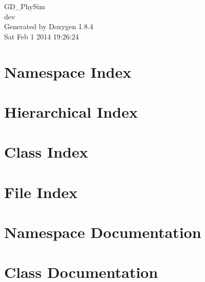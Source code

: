 \documentclass[twoside]{book}
\newcommand{\clearemptydoublepage}{%
  \newpage{\pagestyle{empty}\cleardoublepage}%
}
\begin{document}
\hypersetup{pageanchor=false}
\begin{titlepage}
\vspace*{7cm}
\begin{center}%
{\Large G\-D\-\_\-\-Phy\-Sim \\[1ex]\large dev }\\
\vspace*{1cm}
{\large Generated by Doxygen 1.8.4}\\
\vspace*{0.5cm}
{\small Sat Feb 1 2014 19:26:24}\\
\end{center}
\end{titlepage}
\clearemptydoublepage
\tableofcontents
\clearemptydoublepage
{}
\hypersetup{pageanchor=true}

\chapter{Namespace Index}

\chapter{Hierarchical Index}

\chapter{Class Index}

\chapter{File Index}

\chapter{Namespace Documentation}

\chapter{Class Documentation}














\end{document}
